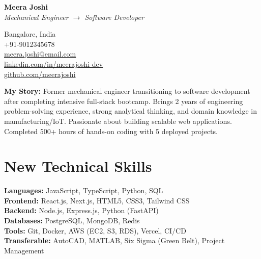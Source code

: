 \documentclass[10.5pt,a4paper]{article}
\begin{document}
\noindent\begin{minipage}[t]{0.55\textwidth}
{\fontsize{22}{26}\selectfont\bfseries\color{accent}Meera Joshi}\\[3pt]
{\small\itshape Mechanical Engineer $\rightarrow$ Software Developer}
\end{minipage}%
\hfill
\begin{minipage}[t]{0.4\textwidth}
\raggedleft\small
Bangalore, India\\
+91-9012345678\\
\href{mailto:meera.joshi@email.com}{meera.joshi@email.com}\\
\href{https://linkedin.com/in/meerajoshi-dev}{linkedin.com/in/meerajoshi-dev}\\
\href{https://github.com/meerajoshi}{github.com/meerajoshi}
\end{minipage}

\vspace{8pt}

\begin{mdframed}[style=summarybox]
\textbf{My Story:} Former mechanical engineer transitioning to software development after completing intensive full-stack bootcamp. Brings 2 years of engineering problem-solving experience, strong analytical thinking, and domain knowledge in manufacturing/IoT. Passionate about building scalable web applications. Completed 500+ hours of hands-on coding with 5 deployed projects.
\end{mdframed}

\section{New Technical Skills}
\textbf{Languages:} JavaScript, TypeScript, Python, SQL\\
\textbf{Frontend:} React.js, Next.js, HTML5, CSS3, Tailwind CSS\\
\textbf{Backend:} Node.js, Express.js, Python (FastAPI)\\
\textbf{Databases:} PostgreSQL, MongoDB, Redis\\
\textbf{Tools:} Git, Docker, AWS (EC2, S3, RDS), Vercel, CI/CD\\
\textbf{Transferable:} AutoCAD, MATLAB, Six Sigma (Green Belt), Project Management
\end{document}
